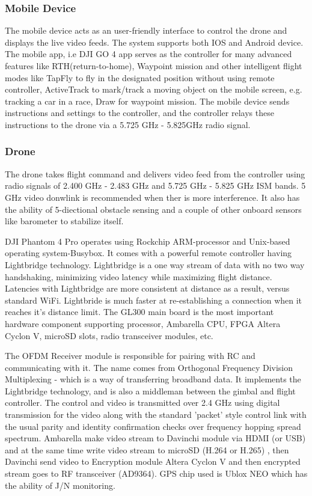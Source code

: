 \documentclass[conference]{IEEEtran}
\begin{document}
\subsubsection{Mobile Device} The mobile device acts as an user-friendly interface to control the drone and displays the live video feeds. The system supports both IOS and Android device. The mobile app, i.e DJI GO 4 app serves as the controller for many advanced features like RTH(return-to-home), Waypoint mission and other intelligent flight modes like TapFly to fly in the designated position without using remote controller, ActiveTrack to mark/track a moving object on the mobile screen, e.g. tracking a car in a race, Draw for waypoint mission. The mobile device sends instructions and settings to the controller, and the controller relays these instructions to the drone via a 5.725 GHz - 5.825GHz radio signal. 

\subsubsection{Drone} The drone takes flight command and delivers video feed from the controller using radio signals of 2.400 GHz - 2.483 GHz and 5.725 GHz - 5.825 GHz ISM bands. 5 GHz video donwlink is recommended when ther is more interference. It also has the ability of 5-diectional obstacle sensing and a couple of other onboard sensors like barometer to stabilize itself. 

DJI Phantom 4 Pro operates using Rockchip ARM-processor and Unix-based operating system-Busybox. It comes with a powerful remote controller having Lightbridge technology. Lightbridge is a one way stream of data with no two way handshaking, minimizing video latency while maximizing flight distance. Latencies with Lightbridge are more consistent at distance as a result, versus standard WiFi. Lightbride is much faster at re-establishing a connection when it reaches it’s distance limit. The GL300 main board is the most important hardware component supporting processor, Ambarella CPU, FPGA Altera Cyclon V, microSD slots, radio transceiver modules, etc. 

The OFDM Receiver module is responsible for pairing with RC and communicating with it. The name comes from Orthogonal Frequency Division Multiplexing - which is a way of transferring broadband data. It implements the Lightbridge technology, and is also a middleman between the gimbal and flight controller. The control and video is transmitted over 2.4 GHz using digital transmission for the video along with the standard 'packet' style control link with the usual parity and identity confirmation checks over frequency hopping spread spectrum.
Ambarella make video stream to Davinchi module via HDMI (or USB) and at the same time write video stream to microSD (H.264 or H.265) , then Davinchi send video to Encryption module Altera Cyclon V and then encrypted stream goes to RF transceiver (AD9364).
GPS chip used is Ublox NEO which has the ability of J/N monitoring.
\end{document}
